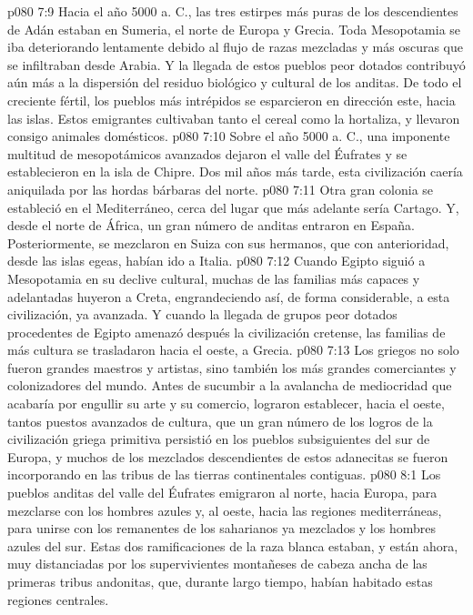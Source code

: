 \vs p080 7:9 \pc Hacia el año 5000 a. C., las tres estirpes más puras de los descendientes de Adán estaban en Sumeria, el norte de Europa y Grecia. Toda Mesopotamia se iba deteriorando lentamente debido al flujo de razas mezcladas y más oscuras que se infiltraban desde Arabia. Y la llegada de estos pueblos peor dotados contribuyó aún más a la dispersión del residuo biológico y cultural de los anditas. De todo el creciente fértil, los pueblos más intrépidos se esparcieron en dirección este, hacia las islas. Estos emigrantes cultivaban tanto el cereal como la hortaliza, y llevaron consigo animales domésticos.
\vs p080 7:10 Sobre el año 5000 a. C., una imponente multitud de mesopotámicos avanzados dejaron el valle del Éufrates y se establecieron en la isla de Chipre. Dos mil años más tarde, esta civilización caería aniquilada por las hordas bárbaras del norte.
\vs p080 7:11 \pc Otra gran colonia se estableció en el Mediterráneo, cerca del lugar que más adelante sería Cartago. Y, desde el norte de África, un gran número de anditas entraron en España. Posteriormente, se mezclaron en Suiza con sus hermanos, que con anterioridad, desde las islas egeas, habían ido a Italia.
\vs p080 7:12 \pc Cuando Egipto siguió a Mesopotamia en su declive cultural, muchas de las familias más capaces y adelantadas huyeron a Creta, engrandeciendo así, de forma considerable, a esta civilización, ya avanzada. Y cuando la llegada de grupos peor dotados procedentes de Egipto amenazó después la civilización cretense, las familias de más cultura se trasladaron hacia el oeste, a Grecia.
\vs p080 7:13 \pc Los griegos no solo fueron grandes maestros y artistas, sino también los más grandes comerciantes y colonizadores del mundo. Antes de sucumbir a la avalancha de mediocridad que acabaría por engullir su arte y su comercio, lograron establecer, hacia el oeste, tantos puestos avanzados de cultura, que un gran número de los logros de la civilización griega primitiva persistió en los pueblos subsiguientes del sur de Europa, y muchos de los mezclados descendientes de estos adanecitas se fueron incorporando en las tribus de las tierras continentales contiguas.
\vs p080 8:1 Los pueblos anditas del valle del Éufrates emigraron al norte, hacia Europa, para mezclarse con los hombres azules y, al oeste, hacia las regiones mediterráneas, para unirse con los remanentes de los saharianos ya mezclados y los hombres azules del sur. Estas dos ramificaciones de la raza blanca estaban, y están ahora, muy distanciadas por los supervivientes montañeses de cabeza ancha de las primeras tribus andonitas, que, durante largo tiempo, habían habitado estas regiones centrales.
